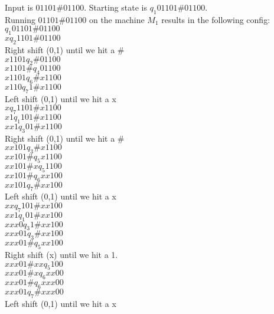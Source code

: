 \documentclass[12pt]{article}
\begin{document}
Input is $01101\#01100$. Starting state is $q_1 01101\#01100$. \\
Running $01101\#01100$ on the machine $M_1$ results in the following config: \\

$                   q_1 01101 \# 01100$ \\
$x                  q_2  1101 \# 01100$ \\
Right shift (0,1) until we hit a $\#$   \\
$x1101              q_2       \# 01100$ \\
$x1101 \#           q_4          01100$ \\
$x1101              q_6       \# x1100$ \\
$x110               q_7     1 \# x1100$ \\
Left shift (0,1) until we hit a x       \\
$x                  q_7  1101 \# x1100$ \\
$x1                 q_1   101 \# x1100$ \\
$xx1                q_3    01 \# x1100$ \\
Right shift (0,1) until we hit a $\#$   \\
$xx101              q_3       \# x1100$ \\
$xx101 \#           q_5          x1100$ \\
$xx101 \# x         q_5           1100$ \\
$xx101 \#           q_6          xx100$ \\
$xx101              q_7       \# xx100$ \\
Left shift (0,1) until we hit a x       \\
$xx                 q_7   101 \# xx100$ \\
$xx1                q_1    01 \# xx100$ \\
$xxx0               q_3     1 \# xx100$ \\
$xxx01              q_3       \# xx100$ \\
$xxx01 \#           q_5          xx100$ \\
Right shift (x) until we hit a 1.       \\
$xxx01 \# xx        q_5            100$ \\
$xxx01 \# x         q_6           xx00$ \\
$xxx01 \#           q_6          xxx00$ \\
$xxx01              q_7       \# xxx00$ \\
Left shift (0,1) until we hit a x       \\
\end{document}
